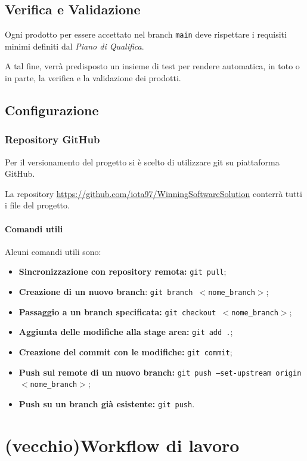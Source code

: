 \documentclass[a4paper, 12pt]{article}
\begin{document}
\subsection{Verifica e Validazione}\label{verifica-e-validazione}
Ogni prodotto per essere accettato nel branch \texttt{main} deve rispettare i requisiti minimi definiti dal \textit{Piano di Qualifica}. 

A tal fine, verrà predisposto un insieme di test per rendere automatica, in toto o in parte, la verifica e la validazione dei prodotti.

\subsection{Configurazione}

\subsubsection{Repository GitHub}\label{configurazione-github}
Per il versionamento del progetto si è scelto di utilizzare git su piattaforma GitHub.

La repository \url{https://github.com/iota97/WinningSoftwareSolution} conterrà tutti i file del progetto.

\paragraph{Comandi utili}
Alcuni comandi utili sono:
\begin{itemize}
\item \textbf{Sincronizzazione con repository remota:} \texttt{git pull};
\item \textbf{Creazione di un nuovo branch}: \texttt{git branch $<$nome\_branch$>$};
\item \textbf{Passaggio a un branch specificata:} \texttt{git checkout $<$nome\_branch$>$};
\item \textbf{Aggiunta delle modifiche alla stage area:} \texttt{git add .};
\item \textbf{Creazione del commit con le modifiche:} \texttt{git commit};
\item \textbf{Push sul remote di un nuovo branch:} \texttt{git push --set-upstream origin $<$nome\_branch$>$};
\item \textbf{Push su un branch già esistente:} \texttt{git push}.
\end{itemize}

\section{(vecchio)Workflow di lavoro}
\end{document}
